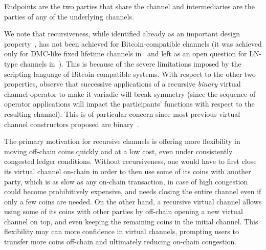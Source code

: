 Endpoints are the two parties that share the channel and intermediaries are
the parties of any of the underlying channels.

We note that recursiveness, while identified already as an important design
property~\cite{DBLP:conf/ccs/DziembowskiFH18}, has not been achieved for Bitcoin-compatible channels
(it was achieved only for DMC-like fixed lifetime channels in~\cite{10.1007/978-3-030-65411-5_18} and left as an open question for LN-type channels in~\cite{9519487}).
This is because of the severe limitations imposed by the scripting language of Bitcoin-compatible systems.
With respect to the other two properties, observe that successive applications
of a recursive {\em binary} virtual channel operator to make it variadic will
break symmetry (since the sequence of operator applications will impact the
participants' functions with respect to the resulting channel). This is of
particular concern since most previous virtual channel constructors proposed are
binary~\cite{DBLP:conf/ccs/DziembowskiFH18,9519487,10.1007/978-3-030-65411-5_18}.

The primary motivation for recursive channels is offering more flexibility in
moving off-chain coins quickly and at a low cost, even under consistently
congested ledger conditions. Without recursiveness, one would have to first
close its virtual channel on-chain in order to then use some of its coins with
another party, which is as slow as any on-chain transaction, in case of high
congestion could become prohibitively expensive, and needs closing the entire
channel even if only a few coins are needed. On the other hand, a recursive
virtual channel allows using some of its coins with other parties by off-chain
opening a new virtual channel on top, and even keeping the remaining coins in
the initial channel. This flexibility may can more confidence in virtual
channels, prompting users to transfer more coins off-chain and ultimately
reducing on-chain congestion.

